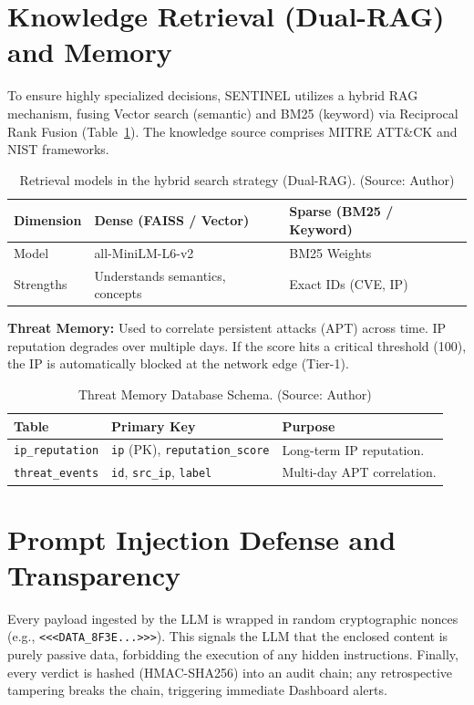 \section{Knowledge Retrieval (Dual-RAG) and Memory}
To ensure highly specialized decisions, SENTINEL utilizes a hybrid RAG mechanism, fusing Vector search (semantic) and BM25 (keyword) via Reciprocal Rank Fusion (Table~\ref{tab:search_comparison}). The knowledge source comprises MITRE ATT\&CK and NIST frameworks.

\begin{table}[!htbp]
    \centering
    \caption{Retrieval models in the hybrid search strategy (Dual-RAG). (Source: Author)}
    \label{tab:search_comparison}
    \begin{tabular}{|>{\raggedright\arraybackslash}p{}|>{\raggedright\arraybackslash}p{}|>{\raggedright\arraybackslash}p{}|}
        \hline
        \textbf{Dimension} & \textbf{Dense (FAISS / Vector)} & \textbf{Sparse (BM25 / Keyword)} \\
        \hline
        Model & all-MiniLM-L6-v2 & BM25 Weights \\ \hline
        Strengths & Understands semantics, concepts & Exact IDs (CVE, IP) \\ \hline
    \end{tabular}
\end{table}

\textbf{Threat Memory:} Used to correlate persistent attacks (APT) across time. IP reputation degrades over multiple days. If the score hits a critical threshold (100), the IP is automatically blocked at the network edge (Tier-1).

\begin{table}[!htbp]
    \centering
    \caption{Threat Memory Database Schema. (Source: Author)}
    \label{tab:threat_memory_schema}
    \begin{tabular}{|>{\raggedright\arraybackslash}p{}|>{\raggedright\arraybackslash}p{}|>{\raggedright\arraybackslash}p{}|}
        \hline
        \textbf{Table} & \textbf{Primary Key} & \textbf{Purpose} \\
        \hline
        \texttt{ip\_reputation} & \texttt{ip} (PK), \texttt{reputation\_score} & Long-term IP reputation. \\ \hline
        \texttt{threat\_events} & \texttt{id}, \texttt{src\_ip}, \texttt{label} & Multi-day APT correlation. \\ \hline
    \end{tabular}
\end{table}

\section{Prompt Injection Defense and Transparency}
Every payload ingested by the LLM is wrapped in random cryptographic nonces (e.g., \texttt{<<<DATA\_8F3E...>>>}). This signals the LLM that the enclosed content is purely passive data, forbidding the execution of any hidden instructions. Finally, every verdict is hashed (HMAC-SHA256) into an audit chain; any retrospective tampering breaks the chain, triggering immediate Dashboard alerts.
